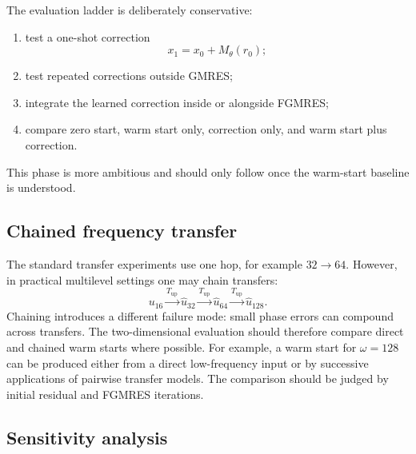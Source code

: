 The evaluation ladder is deliberately conservative:
\begin{enumerate}
    \item test a one-shot correction
    \[
        x_1 = x_0 + M_\theta(r_0);
    \]
    \item test repeated corrections outside GMRES;
    \item integrate the learned correction inside or alongside FGMRES;
    \item compare zero start, warm start only, correction only, and warm start
    plus correction.
\end{enumerate}
This phase is more ambitious and should only follow once the warm-start
baseline is understood.


\subsection{Chained frequency transfer}
\label{subsec:methodology_2d_chaining}

The standard transfer experiments use one hop, for example $32\to64$.
However, in practical multilevel settings one may chain transfers:
\begin{equation}
    u_{16}
    \xrightarrow{T_{\mathrm{up}}}
    \widehat u_{32}
    \xrightarrow{T_{\mathrm{up}}}
    \widehat u_{64}
    \xrightarrow{T_{\mathrm{up}}}
    \widehat u_{128}.
    \label{eq:twod_chained_transfer}
\end{equation}
Chaining introduces a different failure mode: small phase errors can compound
across transfers. The two-dimensional evaluation should therefore compare
direct and chained warm starts where possible. For example, a warm start for
$\omega=128$ can be produced either from a direct low-frequency input or by
successive applications of pairwise transfer models. The comparison should be
judged by initial residual and FGMRES iterations.


\subsection{Sensitivity analysis}
\label{subsec:methodology_2d_sensitivity}

